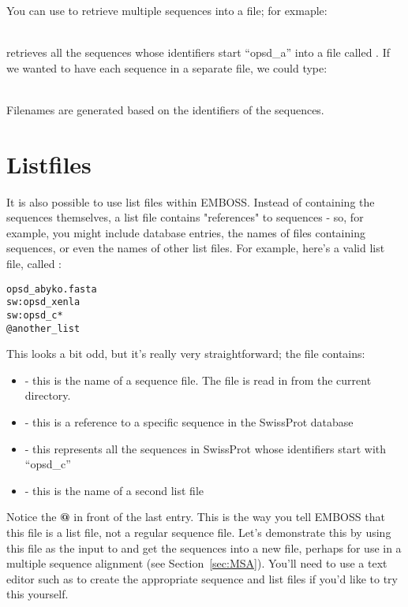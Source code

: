 \documentclass[12pt]{report}
\begin{document}
You can use  to retrieve multiple sequences into a file; for exmaple:

\unix{}\\

retrieves all the sequences whose identifiers start ``opsd\_a'' into a
file called . If we wanted to have each sequence in a
separate file, we could type:

\unix{}\\

Filenames are generated based on the identifiers of the sequences.

\section{Listfiles}
It is also possible to use list files within EMBOSS. Instead of
containing the sequences themselves, a list file contains
"references" to sequences - so, for example, you might include
database entries, the names of files containing sequences, or even the
names of other list files. For example, here's a valid list file,
called :

\unix{}
\begin{verbatim}
opsd_abyko.fasta
sw:opsd_xenla
sw:opsd_c*
@another_list
\end{verbatim}

This looks a bit odd, but it's really very straightforward; the file contains:
\begin{itemize}
\item {} - this is the name of a sequence file. The file is read in from the current directory.
\item {} - this is a reference to a specific sequence in the SwissProt database
\item {} - this represents all the sequences in SwissProt whose identifiers start with ``opsd\_c''
\item {} - this is the name of a second list file
\end{itemize}

Notice the {\bf @} in front of the last entry. This is the way you
tell EMBOSS that this file is a list file, not a regular sequence
file. Let's demonstrate this by using this file as the input to
 and get the sequences into a new file, perhaps
for use in a multiple sequence alignment (see Section~\ref{sec:MSA}). You'll
need to use a text editor such as  to create the appropriate
sequence and list files if you'd like to try this yourself.
\end{document}
